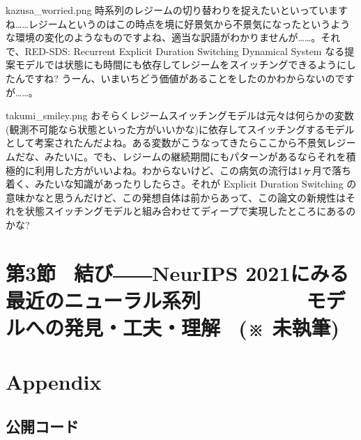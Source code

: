 \documentclass[b5paper,xelatex,ja=standard,10pt]{bxjsarticle}
\begin{document}
\begin{SERIFU}[colback=PaleIris, colbacktitle=PaleIris2]{kazusa_worried.png}
時系列のレジームの切り替わりを捉えたいといっていますね……レジームというのはこの時点を境に好景気から不景気になったというような環境の変化のようなものですよね、適当な訳語がわかりませんが……。それで、RED-SDS: Recurrent Explicit Duration Switching Dynamical System なる提案モデルでは状態にも時間にも依存してレジームをスイッチングできるようにしたんですね? うーん、いまいちどう価値があることをしたのかわからないのですが……。
\end{SERIFU}

\begin{SERIFU}[colback=PaleGold, colbacktitle=PaleGold2]{takumi_smiley.png}
おそらくレジームスイッチングモデルは元々は何らかの変数(観測不可能なら状態といった方がいいかな)に依存してスイッチングするモデルとして考案されたんだよね。ある変数がこうなってきたらここから不景気レジームだな、みたいに。でも、レジームの継続期間にもパターンがあるならそれを積極的に利用した方がいいよね。わからないけど、この病気の流行は1ヶ月で落ち着く、みたいな知識があったりしたらさ。それが Explicit Duration Switching の意味かなと思うんだけど、この発想自体は前からあって、この論文の新規性はそれを状態スイッチングモデルと組み合わせてディープで実現したところにあるのかな?
\end{SERIFU}


\section*{
第3節 \, 結び――NeurIPS 2021にみる最近のニューラル系列 \, 　　　 \, \,  モデルへの発見・工夫・理解 \,
{
(※ 未執筆)
}
}


\section*{Appendix}


\renewcommand*{\mysubsectiontitle}{公開コード}
\subsection*{\mysubsectiontitle}
\addcontentsline{toc}{subsection}{\mysubsectiontitle}
\vspace{3pt}
\end{document}
